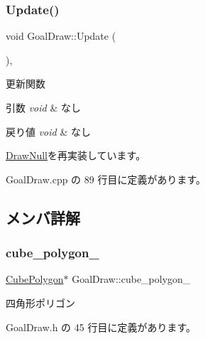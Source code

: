 \subsubsection{\texorpdfstring{Update()}{Update()}}
{\footnotesize\ttfamily void Goal\+Draw\+::\+Update (\begin{DoxyParamCaption}{ }\end{DoxyParamCaption})\hspace{0.3cm}{\ttfamily [override]}, {\ttfamily [virtual]}}



更新関数 


\begin{DoxyParams}{引数}
{\em void} & なし \\
\hline
\end{DoxyParams}

\begin{DoxyRetVals}{戻り値}
{\em void} & なし \\
\hline
\end{DoxyRetVals}


\mbox{\hyperlink{class_draw_null_ad32a508d269de7eda8ad24ea72230464}{Draw\+Null}}を再実装しています。



 Goal\+Draw.\+cpp の 89 行目に定義があります。



\subsection{メンバ詳解}
\mbox{\label{class_goal_draw_add3ff2a5f7cd52a76ccfb95c27aa8a07}} 
\subsubsection{\texorpdfstring{cube\+\_\+polygon\+\_\+}{cube\_polygon\_}}
{\footnotesize\ttfamily \mbox{\hyperlink{class_cube_polygon}{Cube\+Polygon}}$\ast$ Goal\+Draw\+::cube\+\_\+polygon\+\_\+\hspace{0.3cm}{\ttfamily [private]}}



四角形ポリゴン 



 Goal\+Draw.\+h の 45 行目に定義があります。

\mbox{\label{class_goal_draw_a7919744cf877c98faa26781ff59fcffe}} 
